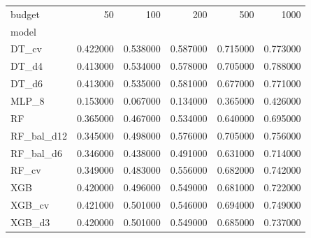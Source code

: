 \begin{tabular}{lrrrrr}
\toprule
budget & 50 & 100 & 200 & 500 & 1000 \\
model &  &  &  &  &  \\
\midrule
DT_cv & 0.422000 & 0.538000 & 0.587000 & 0.715000 & 0.773000 \\
DT_d4 & 0.413000 & 0.534000 & 0.578000 & 0.705000 & 0.788000 \\
DT_d6 & 0.413000 & 0.535000 & 0.581000 & 0.677000 & 0.771000 \\
MLP_8 & 0.153000 & 0.067000 & 0.134000 & 0.365000 & 0.426000 \\
RF & 0.365000 & 0.467000 & 0.534000 & 0.640000 & 0.695000 \\
RF_bal_d12 & 0.345000 & 0.498000 & 0.576000 & 0.705000 & 0.756000 \\
RF_bal_d6 & 0.346000 & 0.438000 & 0.491000 & 0.631000 & 0.714000 \\
RF_cv & 0.349000 & 0.483000 & 0.556000 & 0.682000 & 0.742000 \\
XGB & 0.420000 & 0.496000 & 0.549000 & 0.681000 & 0.722000 \\
XGB_cv & 0.421000 & 0.501000 & 0.546000 & 0.694000 & 0.749000 \\
XGB_d3 & 0.420000 & 0.501000 & 0.549000 & 0.685000 & 0.737000 \\
\bottomrule
\end{tabular}
